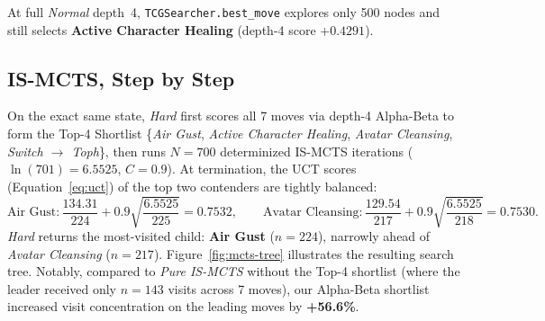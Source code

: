 \documentclass[11pt,a4paper]{article}
\begin{document}
At full \emph{Normal} depth~4, \texttt{TCGSearcher.best\_move} explores only 500 nodes and still selects \textbf{Active Character Healing} (depth-4 score $+0.4291$).

\subsection{IS-MCTS, Step by Step}

On the exact same state, \emph{Hard} first scores all 7 moves via depth-4 Alpha-Beta to form the Top-4 Shortlist \{\emph{Air Gust}, \emph{Active Character Healing}, \emph{Avatar Cleansing}, \emph{Switch $\to$ Toph}\}, then runs $N = 700$ determinized IS-MCTS iterations ($\ln(701) = 6.5525$, $C = 0.9$). At termination, the UCT scores (Equation~\ref{eq:uct}) of the top two contenders are tightly balanced:
\[
  \text{Air Gust}: \frac{134.31}{224} + 0.9\sqrt{\frac{6.5525}{225}} = 0.7532, \qquad
  \text{Avatar Cleansing}: \frac{129.54}{217} + 0.9\sqrt{\frac{6.5525}{218}} = 0.7530.
\]
\emph{Hard} returns the most-visited child: \textbf{Air Gust} ($n = 224$), narrowly ahead of \emph{Avatar Cleansing} ($n = 217$). Figure~\ref{fig:mcts-tree} illustrates the resulting search tree. Notably, compared to \emph{Pure IS-MCTS} without the Top-4 shortlist (where the leader received only $n=143$ visits across 7 moves), our Alpha-Beta shortlist increased visit concentration on the leading moves by \textbf{+56.6\%}.
\end{document}
